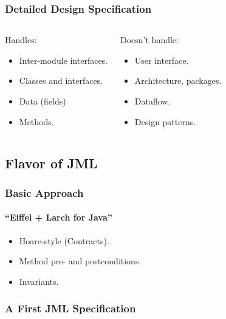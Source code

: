 \begin{frame}
\frametitle{Detailed Design Specification}

\begin{columns}[t]
\begin{block}{Handles:}
\begin{itemize}
\item
Inter-module interfaces.

\item
Classes and interfaces.

\item 
Data (fields)

\item
Methods.
\end{itemize}
\end{block}

\pause

\begin{block}{Doesn't handle:}
\begin{itemize}
\item
User interface.

\item 
Architecture, packages.

\item
Dataflow.

\item
Design patterns.
\end{itemize}
\end{block}
\end{columns}
\end{frame}

\subsection[Flavor]{Flavor of JML}

\begin{frame}
\frametitle{Basic Approach}
\framesubtitle{``Eiffel + Larch for Java''}
\begin{itemize}
\item
Hoare-style (Contracts).

\item
Method pre- and postconditions.

\item
Invariants.
\end{itemize}
\end{frame}

\begin{frame}[fragile]
\frametitle{A First JML Specification}

\end{frame}

